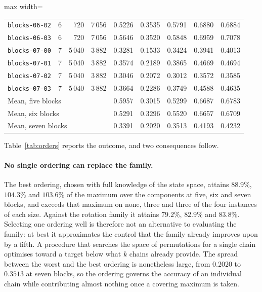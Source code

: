 \documentclass[10pt,twocolumn,a4paper]{article}
\theoremstyle{plain}
\theoremstyle{definition}
\theoremstyle{remark}
\newcommand{\code}[1]{\texttt{#1}}
\begin{document}
\begin{table}[t]
\begin{adjustbox}{max width=\textwidth}
\begin{tabular}{lrrrrrrrr}
\code{blocks-06-02} & 6 & 720 & 7\,056 & 0.5226 & 0.3535 & 0.5791 & 0.6880 & 0.6884 \\
\code{blocks-06-03} & 6 & 720 & 7\,056 & 0.5646 & 0.3520 & 0.5848 & 0.6959 & 0.7078 \\
\midrule
\code{blocks-07-00} & 7 & 5\,040 & 3\,882 & 0.3281 & 0.1533 & 0.3424 & 0.3941 & 0.4013 \\
\code{blocks-07-01} & 7 & 5\,040 & 3\,882 & 0.3574 & 0.2189 & 0.3865 & 0.4669 & 0.4694 \\
\code{blocks-07-02} & 7 & 5\,040 & 3\,882 & 0.3046 & 0.2072 & 0.3012 & 0.3572 & 0.3585 \\
\code{blocks-07-03} & 7 & 5\,040 & 3\,882 & 0.3664 & 0.2286 & 0.3749 & 0.4588 & 0.4635 \\
\midrule
\multicolumn{4}{l}{Mean, five blocks}  & 0.5957 & 0.3015 & 0.5299 & 0.6687 & 0.6783 \\
\multicolumn{4}{l}{Mean, six blocks}   & 0.5291 & 0.3296 & 0.5520 & 0.6657 & 0.6709 \\
\multicolumn{4}{l}{Mean, seven blocks} & 0.3391 & 0.2020 & 0.3513 & 0.4193 & 0.4232 \\
\bottomrule
\end{tabular}
\end{adjustbox}
\end{table}

Table~\ref{tab:orders} reports the outcome, and two consequences follow.

\paragraph{No single ordering can replace the family.}
The best ordering, chosen with full knowledge of the state space, attains
$88.9\%$, $104.3\%$ and $103.6\%$ of the maximum over the components at five,
six and seven blocks, and exceeds that maximum on none, three and three of the
four instances of each size. Against the rotation family it attains $79.2\%$,
$82.9\%$ and $83.8\%$. Selecting one ordering well is therefore not an
alternative to evaluating the family: at best it approximates the control that
the family already improves upon by a fifth. A procedure that searches the
space of permutations for a single chain optimises toward a target below what
$k$ chains already provide. The spread between the worst and the best ordering
is nonetheless large, from $0.2020$ to $0.3513$ at seven blocks, so the
ordering governs the accuracy of an individual chain while contributing almost
nothing once a covering maximum is taken.
\end{document}
